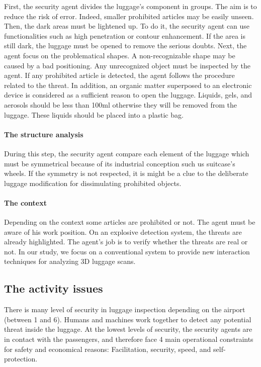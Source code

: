 First, the security agent divides the luggage's component in groups. The aim is to reduce the risk of error. Indeed, smaller prohibited articles may be easily unseen. Then, the dark areas must be lightened up. To do it, the security agent can use functionalities such as high penetration or contour enhancement. If the area is still dark, the luggage must be opened to remove the serious doubts.
Next, the agent focus on the problematical shapes. A non-recognizable shape may be caused by a bad positioning. Any unrecognized object must be inspected by the agent. If any prohibited article is detected, the agent follows the procedure related to the threat. In addition, an organic matter superposed to an electronic device is considered as a sufficient reason to open the luggage. Liquids, gels, and aerosols should be less than 100ml otherwise they will be removed from the luggage. These liquids should be placed into a plastic bag.

\paragraph{The structure analysis}


During this step, the security agent compare each element of the luggage which must be symmetrical because of its industrial conception such us suitcase's wheels. If the symmetry is not respected, it is might be a clue to the deliberate luggage modification for dissimulating prohibited objects.

\paragraph{The context}


Depending on the context some articles are prohibited or not. The agent must be aware of his work position.
On an explosive detection system, the threats are already highlighted. The agent's job is to verify whether the threats are real or not.
In our study, we focus on a conventional system to provide new interaction techniques for analyzing 3D luggage scans.

\subsection{The activity issues}
There is many level of security in luggage inspection depending on the airport (between 1 and 6). Humans and machines work together to detect any potential threat inside the luggage. At the lowest levels of security, the security agents are in contact with the passengers, and therefore face 4 main operational constraints for safety and economical reasons: Facilitation, security, speed, and self-protection. 

